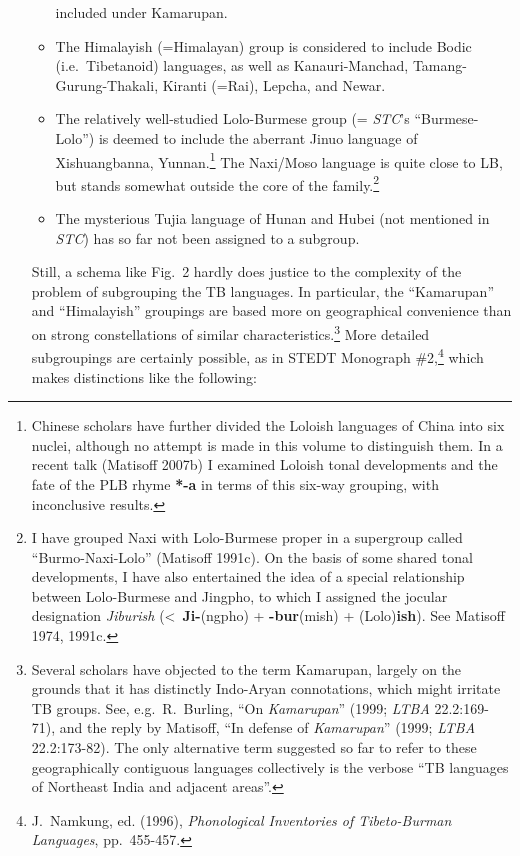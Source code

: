 \begin{itemize}
\begin{itemize}
included under Kamarupan.
\item The Himalayish (=Himalayan) group is considered to include Bodic (i.e.\
\mbox{Tibetanoid}) languages, as well as Kanauri-Manchad, Tamang-Gurung-Thakali,
Kiranti (=Rai), Lepcha, and Newar.
\item The relatively well-studied Lolo-Burmese group (= \textit{STC}’s “Burmese-Lolo”) is
deemed to include the aberrant Jinuo language of Xishuangbanna,
Yunnan.\footnote{Chinese scholars have further divided the Loloish languages of
China into six nuclei, although no attempt is made in this volume to distinguish
them.  In a recent talk (Matisoff 2007b) I examined Loloish tonal developments
and the fate of the PLB rhyme \textbf{*-a} in terms of this six-way grouping, with
inconclusive results.}  The Naxi/Moso language is quite close to LB, but stands
somewhat outside the core of the family.\footnote{I have grouped Naxi with
Lolo-Burmese proper in a supergroup called “Burmo-Naxi-Lolo” (Matisoff 1991c). 
On the basis of some shared tonal developments, I have also entertained the idea
of a special relationship between Lolo-Burmese and Jingpho, to which I assigned
the jocular designation \textit{Jiburish} (<~\textbf{Ji-}(ngpho)
+ \textbf{-bur}(mish) + (Lolo)\textbf{ish}).  See
Matisoff 1974, 1991c.}
\item The mysterious Tujia language of Hunan and Hubei (not mentioned in \textit{STC}) has so
far not been assigned to a subgroup.
\end{itemize}


Still, a schema like Fig.~2 hardly does justice to the complexity
of the problem of subgrouping the TB languages.  In particular, the “Kamarupan”
and “Himalayish” groupings are based more on geographical convenience than on
strong constellations of similar characteristics.\footnote{Several scholars have objected to the term Kamarupan,
largely on the grounds that it has distinctly Indo-Aryan connotations, which
might irritate TB groups.  See, e.g.\ R.~Burling, “On \textit{Kamarupan}” (1999; \textit{LTBA}
22.2:169-71), and the reply by Matisoff, “In defense of \textit{Kamarupan}”
(1999; \textit{LTBA} 22.2:173-82).  The only alternative term
suggested so far to refer to these
geographically contiguous languages collectively is the verbose “TB languages of
Northeast India and adjacent areas”.}
More detailed subgroupings are certainly possible, as in
STEDT Monograph \#2,\footnote{J.~Namkung, ed. (1996),
\textit{Phonological Inventories of Tibeto-Burman Languages},
pp.~455-457.}
which makes distinctions like the following:



\end{itemize}
